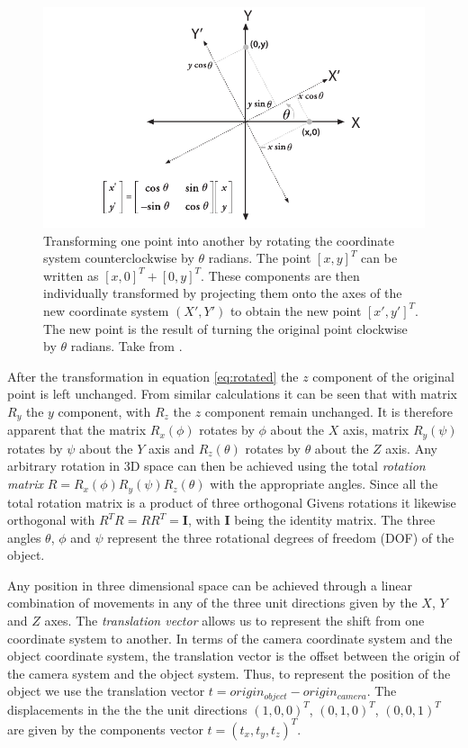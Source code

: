 \documentclass[11pt,a4paper,twoside]{report}
\begin{document}
\begin{figure}[H] 
\centering
\includegraphics[scale=0.75]{images/rotation.png}
\caption{Transforming one point into another by rotating the coordinate system
  counterclockwise by $\theta$ radians. The point $[x,y]^T$ can be written as $[x,0]^T+[0,y]^T.$ These components
are then individually transformed by projecting them onto the axes of the new
coordinate system $(X',Y')$ to obtain the new point $[x',y']^T$. The new point
is the result of turning the original point clockwise by $\theta$ radians. Take
from \cite{opencv}.}
\label{fg:rotations}
\end{figure}

After the transformation in equation \ref{eq:rotated} the $z$ component of the original point is left
unchanged. From similar calculations it can be seen that with matrix $R_y$ the $y$ component, with $R_z$ the $z$ component
remain unchanged. It is therefore apparent that the matrix $R_x(\phi)$ rotates by $\phi$ about the $X$ axis, matrix $R_y(\psi)$ rotates
by $\psi$ about the $Y$ axis and $R_z(\theta)$ rotates by $\theta$ about the $Z$
axis. Any arbitrary rotation in 3D space can then be
achieved using the total \textit{rotation matrix} $R = R_x(\phi)R_y(\psi)R_z(\theta)$ with the
appropriate angles. Since all the total rotation matrix is a product of three
orthogonal Givens rotations it likewise orthogonal with $R^T R = RR^T =
\mathbf{I}$, with $\mathbf{I}$ being the identity matrix. The three angles $\theta$, $\phi$ and $\psi$ represent the three
rotational degrees of freedom (DOF) of the object.

Any position in three dimensional space can be achieved through a
linear combination of movements in any of the three unit directions given by the $X$, $Y$
and $Z$ axes. The \textit{translation vector} allows us to represent the shift
from one coordinate system to another. In terms of the camera coordinate system
and the object coordinate system, the translation vector is the offset between
the origin of the camera system and the object system. Thus, to represent the
position of the object we use the translation vector $t = origin_{object} -
origin_{camera}$. The displacements in the the the unit directions $(1,0,0)^T$,
$(0,1,0)^T$, $(0,0,1)^T$ are given by the components vector $t =
(t_x,t_y,t_z)^T$. 
\end{document}
